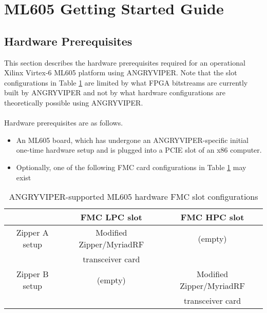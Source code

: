 \documentclass{article}
\begin{document}
\section*{ML605 Getting Started Guide}
\subsection*{Hardware Prerequisites}
This section describes the hardware prerequisites required for an operational Xilinx Virtex-6 ML605 platform using ANGRYVIPER. Note that the slot configurations in Table \ref{table:supported_slots} are limited by what FPGA bitstreams are currently built by ANGRYVIPER and not by what hardware configurations are theoretically possible using ANGRYVIPER.\\ \\
Hardware prerequisites are as follows.
\begin{itemize}
\item An ML605 board, which has undergone an ANGRYVIPER-specific initial one-time hardware setup \cite{ml605_hardware_setup} and is plugged into a PCIE slot of an x86 computer.
\item Optionally, one of the following FMC card configurations in Table  \ref{table:supported_slots} may exist
\end{itemize}
\begin{center}
        \begin{table}[!htbp]
        \centering
        \caption{ANGRYVIPER-supported ML605 hardware FMC slot configurations}
        \label{table:supported_slots}
        \begin{tabular}{c|c|c|}
                \cline{2-3}
                & FMC LPC slot & FMC HPC slot \\ \hline
                \multicolumn{1}{|c|}{Zipper A setup} & Modified\cite{zipper_mods} Zipper/MyriadRF & (empty)\\
                \multicolumn{1}{|c|}{ } & transceiver card & \\ \hline
                \multicolumn{1}{|c|}{Zipper B setup} & (empty) & Modified\cite{zipper_mods} Zipper/MyriadRF \\
                \multicolumn{1}{|c|}{ } & & transceiver card \\ \hline
        \end{tabular}
        \end{table}
\end{center}
\end{document}
